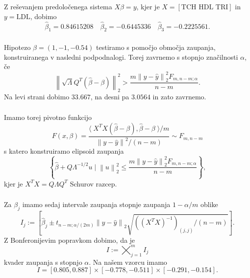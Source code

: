 \documentclass[ letterpaper, titlepage, fleqn]{article}
\newcommand{\norm}[1]{\left\lVert#1\right\rVert}
\newcommand{\scalar}[1]{\langle\;#1\;\rangle}
\begin{document}
\subsubsection{}
Z reševanjem predoločenega sistema $X\hat{\beta} = y$, kjer je $X = [\text{TCH HDL TRI}]$ in $y = \text{LDL}$,  dobimo
$$\hat{\beta}_1 = 0.84615208 \quad \hat{\beta}_2 = -0.6445336 \quad \hat{\beta}_3 =-0.2225561.$$

\subsubsection{}
Hipotezo  $\beta = (1,-1,-0.54)$  testiramo s pomočjo območja zaupanja, konstruiranega v nasledni podpodnalogi. Torej zavrnemo s stopnjo značilnosti $\alpha$, če 
$$\norm{\sqrt{\Lambda} Q^T (\hat{\beta} - \beta)}_2^2 > \frac{m \norm{y - \hat{y}}_2^2 F_{m, n-m; \alpha}}{n-m}.$$
Na levi strani dobimo $33.667$, na desni pa $3.0564$ in zato zavrnemo.

\subsubsection{}
Imamo torej pivotno funkcijo
$$F(x, \beta) = \frac{\scalar{X^T X  (\hat{\beta} - \beta), \hat{\beta} - \beta} / m}{\norm{y - \hat{y}}^2 / (n-m)} \sim F_{m, n-m}$$
s katero konstruiramo elipsoid zaupanja 
$$\left\{\hat{\beta} + Q\Lambda^{-1/2} u \mid \norm{u}_2^2 \leq \frac{m\norm{y - \hat{y}}_2^2  F_{m, n-m; \alpha} }{n-m}\right\},$$
kjer je $X^TX = Q\Lambda Q^T$ Schurov razcep.

\subsubsection{}
Za $\beta_j$ imamo sedaj intervale zaupanja stopnje zaupanja $1 - \alpha / m$ oblike
$$I_j := \left[\hat{\beta}_j \pm t_{n-m;\alpha/(2m)} \norm{y - \hat{y}}_2 \sqrt{((X^TX)^{-1})_{(j,j)} / (n-m)}\right].$$
Z Bonferonijevim popravkom dobimo, da je
$$I := \bigtimes_{j=1}^m I_j$$
kvader zaupanja s stopnjo $\alpha$. Na našem vzorcu imamo
$$I = [0.805, 0.887] \times [-0.778, -0.511] \times [-0.291, -0.154].$$
\end{document}
